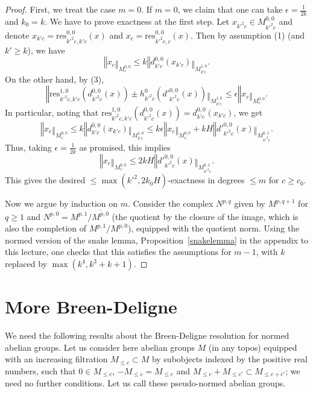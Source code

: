 \begin{proof}
  First, we treat the case $m=0$.
  If $m=0$, we claim that one can take $\epsilon=\tfrac 1{2k}$ and $k_0=k$.
  We have to prove exactness at the first step.
  Let $x_{k'^2c}\in M^{0,0}_{k'^2c}$ and
  denote $x_{k'c}=\mathrm{res}_{k'^2c,k'c}^{0,0}(x)$
  and $x_c=\mathrm{res}_{k'^2c,c}^{0,0}(x)$.
  Then by assumption (1) (and $k'\geq k$), we have
  \[
  ‖x_c‖_{M^{0,0}_c}\leq k‖d^{0,0}_{k'c}(x_{k'c})‖_{M^{1,0}_{k'c}}.
  \]
  On the other hand, by (3),
  \[
  ‖\mathrm{res}_{k'^2c,k'c}^{1,0}(d^{0,0}_{k'^2c}(x))\pm h^0_{k'^2c}(d'^{0,0}_{k'^2c}(x))‖_{M^{1,0}_{k'c}}\leq \epsilon ‖x_c‖_{M^{0,0}_c}.
  \]
  In particular, noting that $\mathrm{res}_{k'^2c,k'c}^{1,0}(d^{0,0}_{k'^2c}(x)) = d^{0,0}_{k'c}(x_{k'c})$, we get
  \[
  ‖x_c‖_{M^{0,0}_c}\leq k‖d^{0,0}_{k'c}(x_{k'c})‖_{M^{1,0}_{k'c}}\leq k\epsilon ‖x_c‖_{M^{0,0}_c} + kH ‖d'^{0,0}_{k'^2c}(x)‖_{M^{0,1}_{k'^2c}}.
  \]
  Thus, taking $\epsilon=\tfrac 1{2k}$ as promised, this implies
  \[
  ‖x_c‖_{M^{0,0}_c}\leq 2kH ‖d'^{0,0}_{k'^2c}(x)‖_{M^{0,1}_{k'^2c}}.
  \]
  This gives the desired $\leq \max(k'^2,2k_0H)$-exactness in degrees $\leq m$ for $c\geq c_0$.

  Now we argue by induction on $m$.
  Consider the complex $N^{p,q}$ given by $M^{p,q+1}$ for $q\geq 1$
  and $N^{p,0} = M^{p,1}/\overline{M^{p,0}}$
  (the quotient by the closure of the image, which is also the completion of $M^{p,1}/M^{p,0}$),
  equipped with the quotient norm.
  Using the normed version of the snake lemma,
  Proposition~\ref{snakelemma} in the appendix to this lecture,
  one checks that this satisfies the assumptions for $m-1$,
  with $k$ replaced by $\max(k^4,k^3+k+1)$.
\end{proof}

\section{More Breen-Deligne}%
\label{sec:more_breen_deligne}


We need the following results about the Breen-Deligne resolution for normed abelian groups. Let us consider here abelian groups $M$ (in any topos) equipped with an increasing filtration $M_{\leq c}\subset M$ by subobjects indexed by the positive real numbers, such that $0\in M_{\leq c}$, $-M_{\leq c} = M_{\leq c}$ and $M_{\leq c}+M_{\leq c'}\subset M_{\leq c+c'}$; we need no further conditions. Let us call these pseudo-normed abelian groups.

